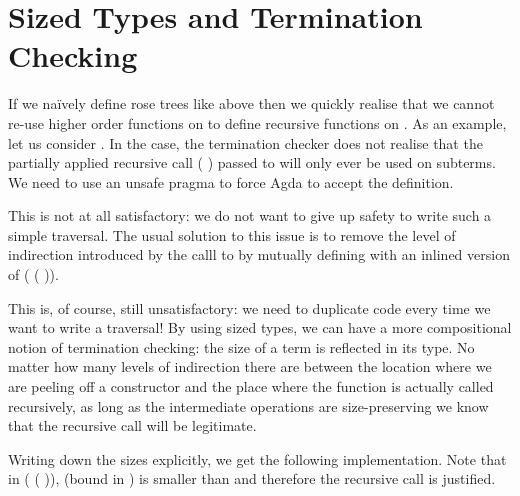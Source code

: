 
\section{Sized Types and Termination Checking}
\label{sec:sizetermination}

If we naïvely define rose trees like above then we quickly realise that we cannot
re-use higher order functions on  to define recursive functions on .
As an example, let us consider . In the  case,
the termination checker does not realise that the partially applied recursive call
( ) passed to 
will only ever be used on subterms. We need to use an unsafe  pragma
to force Agda to accept the definition.


This is not at all satisfactory: we do not want to give up safety to write such a
simple traversal. The usual solution to this issue is to remove the level of
indirection introduced by the calll to  by mutually
defining with  an inlined version of
( ( )).


This is, of course, still unsatisfactory: we need to duplicate code every
time we want to write a traversal! By using sized types, we can have a more
compositional notion of termination checking: the size of a term is reflected
in its type. No matter how many levels of indirection there are between the
location where we are peeling off a constructor and the place where the function
is actually called recursively, as long as the intermediate operations are
size-preserving we know that the recursive call will be legitimate.

Writing down the sizes explicitly, we get the following implementation. Note
that in ( (  )),
 (bound in ) is smaller than  and therefore the recursive
call is justified.


